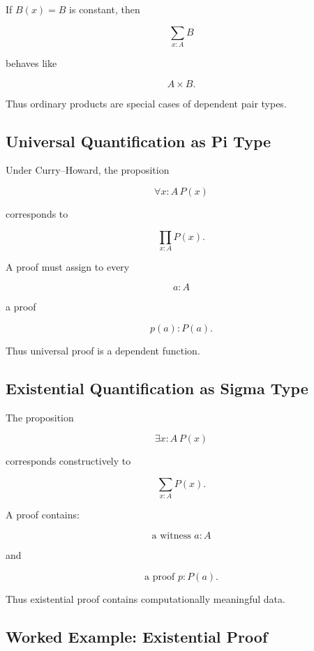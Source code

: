 If \(B(x)=B\) is constant, then

\[
\boxed{
\sum_{x:A}B
}
\]

behaves like

\[
\boxed{
A\times B.
}
\]

Thus ordinary products are special cases of dependent pair types.

\subsection{Universal Quantification as Pi Type}
\label{subsec:forall-pi-type}

Under Curry--Howard, the proposition

\[
\forall x:A\,P(x)
\]

corresponds to

\[
\boxed{
\prod_{x:A}P(x).
}
\]

A proof must assign to every

\[
a:A
\]

a proof

\[
\boxed{
p(a):P(a).
}
\]

Thus universal proof is a dependent function.

\subsection{Existential Quantification as Sigma Type}
\label{subsec:exists-sigma-type}

The proposition

\[
\exists x:A\,P(x)
\]

corresponds constructively to

\[
\boxed{
\sum_{x:A}P(x).
}
\]

A proof contains:

\[
\boxed{
\text{a witness }a:A
}
\]

and

\[
\boxed{
\text{a proof }p:P(a).
}
\]

Thus existential proof contains computationally meaningful data.

\subsection{Worked Example: Existential Proof}
\label{subsec:worked-existential-sigma}

